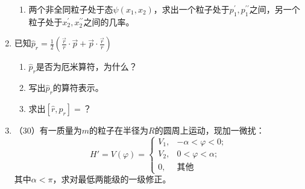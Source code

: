 \begin{enumerate}
\begin{enumerate}
\item 
两个非全同粒子处于态$\psi(x_1,x_2)$，求出一个粒子处于$p_{1}^{\prime}, p_{1}^{\prime \prime}$之间，另一个粒子处于$x_{2}^{\prime}, x_{2}^{\prime \prime}$之间的几率。



\end{enumerate}


\item 	已知$\hat{p}_r=\frac{1}{2}(\frac{\vec{r}}{r}\cdot\vec{p}+\vec{p}\cdot\frac{\vec{r}}{r})$
\begin{enumerate}
	\item
$\hat{p}_r$是否为厄米算符，为什么？
\item 
写出$\hat{p}_r$的算符表示。
\item 
求出$[\hat{r},\hat{p}_r]=$？
\end{enumerate}





\newpage
\item 
（$30$）有一质量为$m$的粒子在半径为$R$的圆周上运动，现加一微扰：
$$
H'=V(\varphi)=\begin{cases}
V_1,&-\alpha<\varphi<0;\\
V_2,&0<\varphi<\alpha;\\
0,     &\text{其他}
\end{cases}
$$
其中$\alpha<\pi$，求对最低两能级的一级修正。


\end{enumerate}
